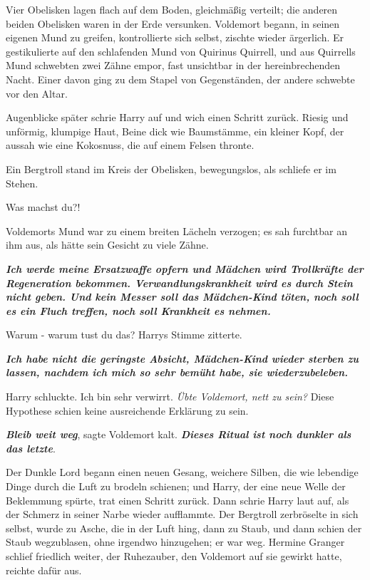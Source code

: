 Vier Obelisken lagen flach auf dem Boden, gleichmäßig verteilt; die anderen
beiden Obelisken waren in der Erde versunken. Voldemort begann, in seinen
eigenen Mund zu greifen, kontrollierte sich selbst, zischte wieder ärgerlich. Er
gestikulierte auf den schlafenden Mund von Quirinus Quirrell, und aus Quirrells
Mund schwebten zwei Zähne empor, fast unsichtbar in der hereinbrechenden Nacht.
Einer davon ging zu dem Stapel von Gegenständen, der andere schwebte vor den
Altar.

Augenblicke später schrie Harry auf und wich einen Schritt zurück. Riesig und
unförmig, klumpige Haut, Beine dick wie Baumstämme, ein kleiner Kopf, der aussah
wie eine Kokosnuss, die auf einem Felsen thronte.

Ein Bergtroll stand im Kreis der Obelisken, bewegungslos, als schliefe er im
Stehen.

\glqq{}Was machst du?!\grqq{}

Voldemorts Mund war zu einem breiten Lächeln verzogen; es sah furchtbar an ihm
aus, als hätte sein Gesicht zu viele Zähne.

\glqq{}\textbf{\emph{Ich werde meine Ersatzwaffe opfern und Mädchen wird
Trollkräfte der Regeneration bekommen. Verwandlungskrankheit wird es durch Stein
nicht geben. Und kein Messer soll das Mädchen-Kind töten, noch soll es ein Fluch
treffen, noch soll Krankheit es nehmen.}}\grqq{}

\glqq{}Warum - warum tust du das?\grqq{} Harrys Stimme zitterte.

\glqq{}\textbf{\emph{Ich habe nicht die geringste Absicht, Mädchen-Kind wieder
sterben zu lassen, nachdem ich mich so sehr bemüht habe, sie wiederzubeleben.}}\grqq{}

Harry schluckte. \glqq{}Ich bin sehr verwirrt.\grqq{}
\emph{Übte Voldemort, nett zu sein?}
Diese Hypothese schien keine ausreichende Erklärung zu sein.

\glqq{}\textbf{\emph{Bleib weit weg}}\grqq{}, sagte Voldemort kalt. \glqq{}
\textbf{\emph{Dieses Ritual ist noch dunkler als das letzte}}.\grqq{}

Der Dunkle Lord begann einen neuen Gesang, weichere Silben, die wie lebendige
Dinge durch die Luft zu brodeln schienen; und Harry, der eine neue Welle der
Beklemmung spürte, trat einen Schritt zurück. Dann schrie Harry laut auf, als
der Schmerz in seiner Narbe wieder aufflammte. Der Bergtroll zerbröselte in sich
selbst, wurde zu Asche, die in der Luft hing, dann zu Staub, und dann schien der
Staub wegzublasen, ohne irgendwo hinzugehen; er war weg. Hermine Granger schlief
friedlich weiter, der Ruhezauber, den Voldemort auf sie gewirkt hatte, reichte
dafür aus.

